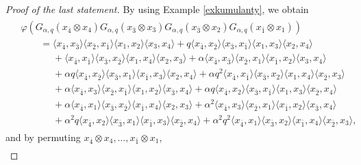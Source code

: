 \documentclass[pdftex]{sigma}
\numberwithin{equation}{section}
\def\G{G_{\s,\q}}
\def\state {\varphi}
\newcommand{\q}{q}
\newcommand{\s}{\alpha}%
\begin{document}
\begin{proof}[Proof of the last statement]
By using Example \ref{exkumulanty}, we obtain
\begin{align*}
\begin{split}
&\state(\G(x_{\overline{ 4}}\otimes x_{ 4})\G(x_{\overline{ 3}}\otimes x_{ 3})\G(x_{\overline{ 3}}\otimes x_{ 2}) \G(x_{\bar 1}\otimes x_{ 1}))
\\
&\qquad=\langle x_{\bar 4}, x_{\bar 3}\rangle \langle x_{\bar 2}, x_{\bar 1}\rangle \langle x_{1}, x_{2}\rangle\langle x_{3}, x_{4}\rangle +\q \langle x_{\bar 4}, x_{\bar 2}\rangle \langle x_{\bar 3}, x_{\bar 1}\rangle \langle x_{1}, x_{3}\rangle\langle x_{2}, x_{4}\rangle
\\
&\qquad\phantom{=}+ \langle x_{\bar 4}, x_{\bar 1}\rangle \langle x_{\bar 3}, x_{\bar 2}\rangle \langle x_{1}, x_{4}\rangle\langle x_{2}, x_{3}\rangle +\s\langle x_{\bar 4}, x_{\bar 3}\rangle \langle x_{\bar 2}, x_{ 1}\rangle \langle x_{\bar 1}, x_{2}\rangle\langle x_{3}, x_{4}\rangle
\\
&\qquad\phantom{=}+\s \q \langle x_{\bar 4}, x_{\bar 2}\rangle \langle x_{\bar 3}, x_{1}\rangle \langle x_{\bar 1}, x_{3}\rangle\langle x_{2}, x_{4}\rangle +\alpha\q^2 \langle x_{\bar 4}, x_{\bar 1}\rangle \langle x_{\bar 3}, x_{ 2}\rangle \langle x_{1}, x_{4}\rangle\langle x_{\bar 2}, x_{3}\rangle
\\
&\qquad\phantom{=}+ \s\langle x_{\bar 4}, x_{ 3}\rangle \langle x_{\bar 2}, x_{ \bar 1}\rangle \langle x_{ 1}, x_{ 2}\rangle\langle x_{\bar 3}, x_{4}\rangle +\s\q \langle x_{\bar 4}, x_{ 2}\rangle \langle x_{\bar 3}, x_{\bar 1}\rangle \langle x_{ 1}, x_{3}\rangle\langle x_{\bar 2}, x_{4}\rangle
\\
&\qquad\phantom{=}+\s\langle x_{\bar 4}, x_{ 1}\rangle \langle x_{\bar 3}, x_{ \bar 2}\rangle \langle x_{\bar 1}, x_{4}\rangle\langle x_{ 2}, x_{3}\rangle +\s^2\langle x_{\bar 4}, x_{ 3}\rangle \langle x_{\bar 2}, x_{ 1}\rangle \langle x_{ \bar 1}, x_{ 2}\rangle\langle x_{\bar 3}, x_{4}\rangle
\\
&\qquad\phantom{=}+\s^2\q \langle x_{\bar 4}, x_{ 2}\rangle \langle x_{\bar 3}, x_{1}\rangle \langle x_{\bar 1}, x_{3}\rangle\langle x_{\bar 2}, x_{4}\rangle +\s^2q^2\langle x_{\bar 4}, x_{ 1}\rangle \langle x_{\bar 3}, x_{ 2}\rangle \langle x_{\bar 1}, x_{4}\rangle\langle x_{ \bar 2}, x_{3}\rangle,
\end{split}
\end{align*}
and by permuting $x_{\overline{ 4}}\otimes x_{ 4},\dots, x_{\bar 1}\otimes x_{ 1}$,
\begin{align*}

\end{align*}
\end{proof}
\end{document}
